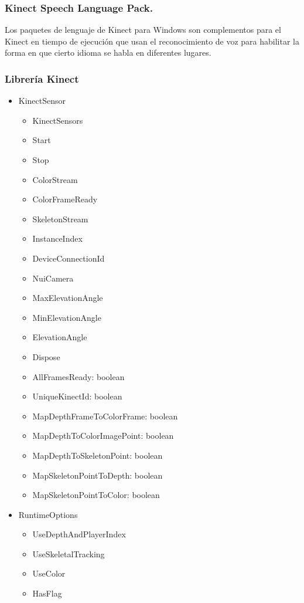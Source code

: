 \documentclass[11pt,a4paper]{article}
\begin{document}
\subsubsection{Kinect Speech Language Pack.}
Los paquetes de lenguaje de Kinect para Windows son complementos para el Kinect en tiempo de ejecución que usan el reconocimiento de voz para habilitar la forma en que cierto idioma se habla en diferentes lugares.

\subsubsection{Librería Kinect}
\begin{itemize}
\item KinectSensor
	\begin{itemize}
	\item KinectSensors
	\item Start
	\item Stop
	\item ColorStream
	\item ColorFrameReady
	\item SkeletonStream
	\item InstanceIndex
	\item DeviceConnectionId
	\item NuiCamera
	\item MaxElevationAngle
	\item MinElevationAngle
	\item ElevationAngle
	\item Dispose
	\item AllFramesReady: boolean	
	\item UniqueKinectId: boolean	
	\item MapDepthFrameToColorFrame: boolean
	\item MapDepthToColorImagePoint: boolean
	\item MapDepthToSkeletonPoint: boolean
	\item MapSkeletonPointToDepth: boolean
	\item MapSkeletonPointToColor: boolean	
	\end{itemize}
\item RuntimeOptions
	\begin{itemize}
	\item UseDepthAndPlayerIndex
	\item UseSkeletalTracking
	\item UseColor
	\item HasFlag

\end{itemize}
\end{itemize}
\end{document}
